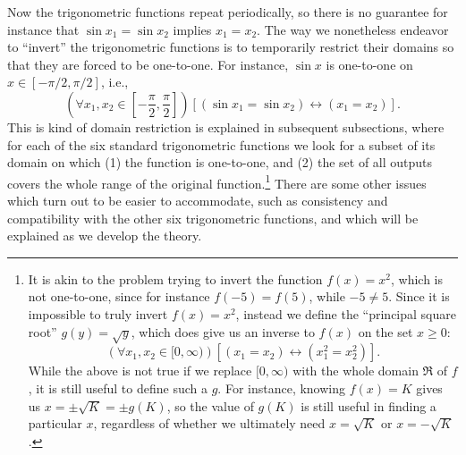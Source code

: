 Now the trigonometric functions repeat periodically, 
so there is no guarantee for 
instance that $\sin x_1=\sin x_2$ implies $x_1=x_2$.
The way we nonetheless endeavor to ``invert'' the trigonometric
functions is to temporarily restrict their domains so that they are
forced to be one-to-one. 
For instance,  $\sin x$ is one-to-one
on $x\in[-{\pi}/2,{\pi}/2]$, i.e.,
$$\left(\forall x_1,x_2\in\left[-\frac{\pi}2,\frac{\pi}2\right]\right)
\left[\left(\sin x_1=\sin x_2\right)\longleftrightarrow
\left(x_1=x_2\right)\right].$$
This is kind of domain restriction is explained in subsequent subsections, 
where for each of the six standard trigonometric functions
we look for a subset of its domain on which
(1) the function is one-to-one, and (2) the set of all outputs 
covers the whole range of the original function.\footnote{%
It is 
akin to the problem trying to invert the function
$f(x)=x^2$, which  is not one-to-one, since
for instance $f(-5)=f(5)$, while $-5\ne 5$. Since it is impossible to 
truly invert $f(x)=x^2$, instead we define the ``principal square
root'' $g(y)=\sqrt{y}$,
which does give us an inverse to $f(x)$ on the set $x\ge0$:
$$\left(\forall x_1,x_2\in[0,\infty)\right)\left[
   \left(x_1=x_2\right)\longleftrightarrow\left(x_1^2=x_2^2\right)\right].$$
While the above is not true if we replace $[0,\infty)$ with the whole
domain $\Re$ of $f$, it is still useful to define such a $g$.
For instance, knowing $f(x)=K$ gives us $x=\pm\sqrt{K}=\pm g(K)$,
so the value of $g(K)$ is still useful in finding a particular
$x$, regardless of whether we ultimately need $x=\sqrt{K}$ or $x=-\sqrt{K}$.
} %
There are some
other issues which turn out to be easier to accommodate,
such as consistency and compatibility with the other
six trigonometric functions, and which will be explained as we develop
the theory.






